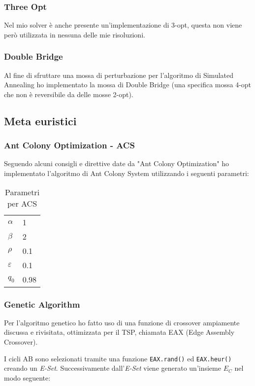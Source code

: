 \documentclass{article}
\newcommand{\mvar}[1]{\textrm{\textit{#1}}}
\newcommand{\ic}[1]{\texttt{#1}}
\begin{document}
\subsubsection{Three Opt}
Nel mio solver è anche presente un'implementazione di 3-opt,
questa non viene però utilizzata in nessuna delle mie risoluzioni. 

\subsubsection{Double Bridge}
Al fine di sfruttare una mossa di perturbazione per l'algoritmo di Simulated Annealing
ho implementato la mossa di Double Bridge (una specifica mossa 4-opt che non è reversibile
da delle mosse 2-opt).

\subsection{Meta euristici}
\subsubsection{Ant Colony Optimization - ACS}
Seguendo alcuni consigli e direttive date da "Ant Colony Optimization" \cite{aco}
ho implementato l'algoritmo di Ant Colony System utilizzando i seguenti parametri:

\begin{table}
\begin{tabular}{|l|l|}
    \hline
    $\alpha$ & 1 \\
    $\beta$ & 2 \\
    $\rho$ & 0.1 \\
    $\varepsilon$ & 0.1 \\
    $q_0$ & 0.98 \\
    \hline
\end{tabular}
\caption{Parametri per ACS}
\end{table}
\subsubsection{Genetic Algorithm}
Per l'algoritmo genetico ho fatto uso di una funzione di crossover ampiamente
discussa e rivisitata, ottimizzata per il TSP, chiamata EAX (Edge Assembly
Crossover).

I cicli AB sono selezionati tramite una funzione \ic{EAX.rand()} ed
\ic{EAX.heur()} creando un \mvar{E-Set}.
Successivamente dall'\mvar{E-Set} viene generato un'insieme $E_C$ nel modo seguente: 
\end{document}
